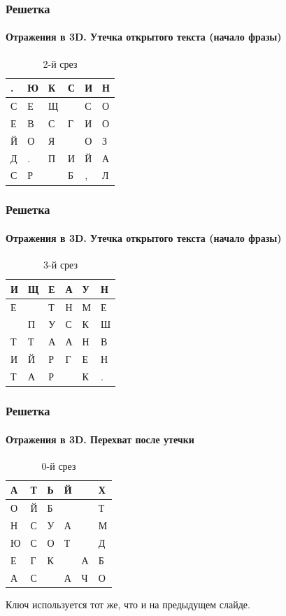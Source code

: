 \begin{frame}[fragile]
    \frametitle{Решетка}
    \framesubtitle{Отражения в 3D. Утечка открытого текста (начало фразы)}
    
    \begin{table}[ht]
        \caption{2-й срез}
        \centering
        \begin{tabular}[c]{|l|l|l|l|l|l|}
            \hline
            .&Ю&К&С&И&Н\\ \hline
            С&Е&Щ& &С&О\\ \hline
            Е&В&С&Г&И&О\\ \hline
            Й&О&Я& &О&З\\ \hline
            Д&.&П&И&Й&А\\ \hline
            С&Р& &Б&,&Л\\ \hline
        \end{tabular}
    \end{table}
\end{frame}


\begin{frame}[fragile]
    \frametitle{Решетка}
    \framesubtitle{Отражения в 3D. Утечка открытого текста (начало фразы)}
    
    \begin{table}[ht]
        \caption{3-й срез}
        \centering
        \begin{tabular}[c]{|l|l|l|l|l|l|}
            \hline
            И&Щ&Е&А&У&Н\\ \hline
            Е& &Т&Н&М&Е\\ \hline
             &П&У&С&К&Ш\\ \hline
            Т&Т&А&А&Н&В\\ \hline
            И&Й&Р&Г&Е&Н\\ \hline
            Т&А&Р& &К&.\\ \hline
        \end{tabular}
    \end{table}
\end{frame}


\begin{frame}[fragile]
    \frametitle{Решетка}
    \framesubtitle{Отражения в 3D. Перехват после утечки}
    
    \begin{table}[ht]
        \caption{0-й срез}
        \centering
        \begin{tabular}[c]{|l|l|l|l|l|l|}
            \hline
            А&Т&Ь&Й& &Х\\ \hline
            О&Й&Б& & &Т\\ \hline
            Н&С&У&А& &М\\ \hline
            Ю&С&О&Т& &Д\\ \hline
            Е&Г&К& &А&Б\\ \hline
            А&С& &А&Ч&О\\ \hline
        \end{tabular}
    \end{table}
    
    Ключ используется тот же, что и на предыдущем слайде.
\end{frame}


